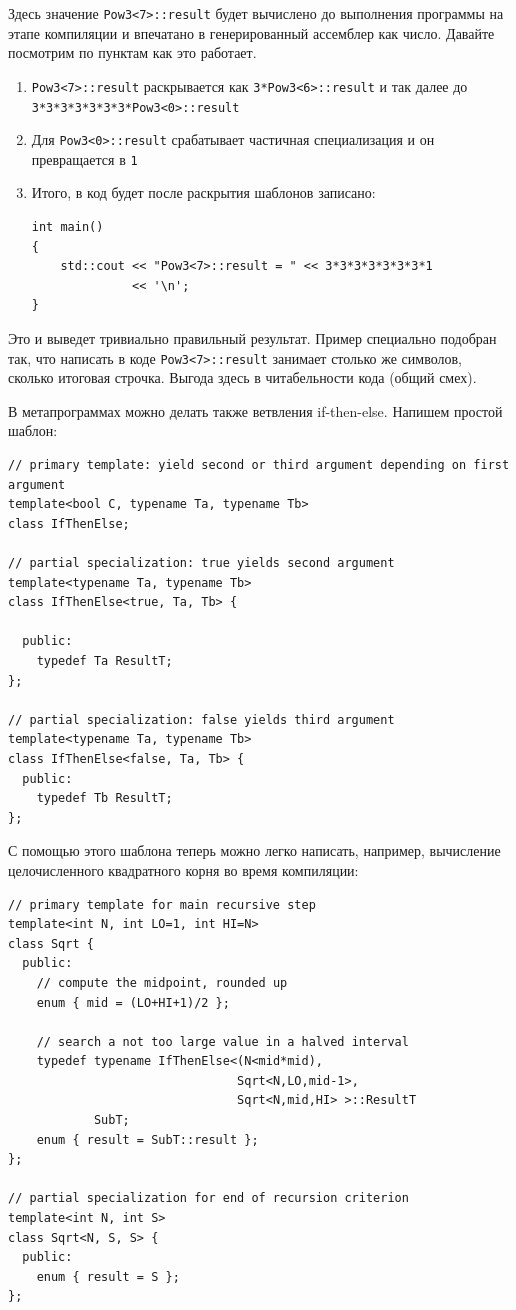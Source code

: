 \documentclass[a4paper,12pt,oneside]{article}
\begin{document}
Здесь значение \lstinline!Pow3<7>::result! будет вычислено до выполнения программы на этапе компиляции и впечатано в генерированный ассемблер как число. Давайте посмотрим по пунктам как это работает.

\begin{enumerate}
\item
\lstinline!Pow3<7>::result! раскрывается как \lstinline!3*Pow3<6>::result! и так далее до \lstinline!3*3*3*3*3*3*3*Pow3<0>::result!
\item
Для \lstinline!Pow3<0>::result! срабатывает частичная специализация и он превращается в \lstinline!1!
\item
Итого, в код будет после раскрытия шаблонов записано:
\begin{lstlisting}
int main() 
{ 
    std::cout << "Pow3<7>::result = " << 3*3*3*3*3*3*3*1                                         
              << '\n'; 
} 
\end{lstlisting}
\end{enumerate}

Это и выведет тривиально правильный результат. Пример специально подобран так, что написать в коде \lstinline!Pow3<7>::result! занимает столько же символов, сколько итоговая строчка. Выгода здесь в читабельности кода (общий смех). 

В метапрограммах можно делать также ветвления if-then-else. Напишем простой шаблон:

\begin{lstlisting}
// primary template: yield second or third argument depending on first argument 
template<bool C, typename Ta, typename Tb> 
class IfThenElse; 

// partial specialization: true yields second argument 
template<typename Ta, typename Tb> 
class IfThenElse<true, Ta, Tb> { 

  public: 
    typedef Ta ResultT; 
}; 

// partial specialization: false yields third argument 
template<typename Ta, typename Tb> 
class IfThenElse<false, Ta, Tb> { 
  public: 
    typedef Tb ResultT; 
}; 
\end{lstlisting}

С помощью этого шаблона теперь можно легко написать, например, вычисление целочисленного квадратного корня во время компиляции:

\begin{lstlisting}
// primary template for main recursive step 
template<int N, int LO=1, int HI=N> 
class Sqrt { 
  public: 
    // compute the midpoint, rounded up 
    enum { mid = (LO+HI+1)/2 }; 

    // search a not too large value in a halved interval 
    typedef typename IfThenElse<(N<mid*mid), 
                                Sqrt<N,LO,mid-1>, 
                                Sqrt<N,mid,HI> >::ResultT 
            SubT; 
    enum { result = SubT::result }; 
}; 

// partial specialization for end of recursion criterion 
template<int N, int S> 
class Sqrt<N, S, S> { 
  public: 
    enum { result = S }; 
}; 
\end{lstlisting}
\end{document}
